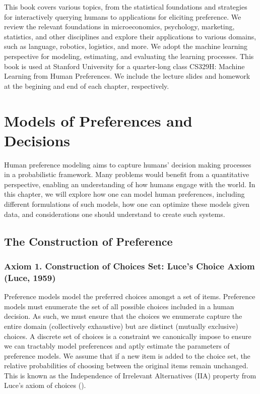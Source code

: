 \documentclass[
  letterpaper,
  numbers=noenddot,
  DIV=11]{scrreprt}
\let\oldchapter\chapter
\def\chapter{%
  \setcounter{sidenote}{1}%
  \oldchapter
}
\theoremstyle{plain}
\theoremstyle{definition}
\theoremstyle{plain}
\theoremstyle{remark}
\begin{document}
This book covers various topics, from the statistical foundations and
strategies for interactively querying humans to applications for
eliciting preference. We review the relevant foundations in
microeconomics, psychology, marketing, statistics, and other disciplines
and explore their applications to various domains, such as language,
robotics, logistics, and more. We adopt the machine learning perspective
for modeling, estimating, and evaluating the learning processes. This
book is used at Stanford University for a quarter-long class CS329H:
Machine Learning from Human Preferences. We include the lecture slides
and homework at the begining and end of each chapter, respectively.


\chapter{Models of Preferences and
Decisions}\label{models-of-preferences-and-decisions}

Human preference modeling aims to capture humans' decision making
processes in a probabilistic framework. Many problems would benefit from
a quantitative perspective, enabling an understanding of how humans
engage with the world. In this chapter, we will explore how one can
model human preferences, including different formulations of such
models, how one can optimize these models given data, and considerations
one should understand to create such systems.

\section{The Construction of Preference}\label{sec-foundations}

\subsection{Axiom 1. Construction of Choices Set: Luce's Choice Axiom
(Luce, 1959)}\label{axiom-1-preference-models-model-choice}

Preference models model the preferred choices amongst a set of items.
Preference models must enumerate the set of all possible choices
included in a human decision. As such, we must ensure that the choices
we enumerate capture the entire domain (collectively exhaustive) but are
distinct (mutually exclusive) choices. A discrete set of choices is a
constraint we canonically impose to ensure we can tractably model
preferences and aptly estimate the parameters of preference models. We
assume that if a new item is added to the choice set, the relative
probabilities of choosing between the original items remain unchanged.
This is known as the Independence of Irrelevant Alternatives (IIA)
property from Luce's axiom of choices ().
\end{document}
